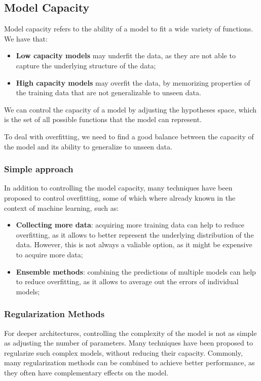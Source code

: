 \subsection{Model Capacity}
Model capacity refers to the ability of a model to fit a wide variety of functions. We have that:
\begin{itemize}
    \item \textbf{Low capacity models} may underfit the data, as they are not able to capture the underlying structure of the data;
    \item \textbf{High capacity models} may overfit the data, by memorizing properties of the training data that are not generalizable to unseen data.
\end{itemize}
We can control the capacity of a model by adjusting the hypotheses space, which is the set of all possible functions that
the model can represent.

To deal with overfitting, we need to find a good balance between the capacity of the model and its ability to generalize to unseen data.

\subsubsection{Simple approach}
In addition to controlling the model capacity, many techniques have been proposed to control overfitting, some of which where already known in the context of machine learning, such as:
\begin{itemize}
    \item \textbf{Collecting more data}: acquiring more training data can help to reduce overfitting, as it allows to better represent the underlying distribution of the data.
    However, this is not always a valiable option, as it might be expensive to acquire more data;
    \item \textbf{Ensemble methods}: combining the predictions of multiple models can help to reduce overfitting, as it allows to average out the errors of individual models;
\end{itemize}

\subsubsection{Regularization Methods}
For deeper architectures, controlling the complexity of the model is not as simple as adjusting the number of parameters.
Many techniques have been proposed to regularize such complex models, without reducing their capacity.
Commonly, many regularization methods can be combined to achieve better performance, as they often have complementary effects on the model.

